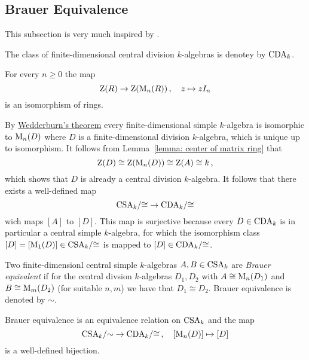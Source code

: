\subsection{Brauer Equivalence}


\begin{fluff}
  This subsection is very much inspired by \cite[4.2]{Clark2012NonCA}.
\end{fluff}


\begin{notation}
  The class of finite-dimensional central division $k$-algebras is denotey by $\operatorname{CDA}_k$.
\end{notation}


\begin{lemma}
  \label{lemma: center of matrix ring}
  For every $n \geq 0$ the map
  \[
            \operatorname{Z}(R)
    \to     \operatorname{Z}(\operatorname{M}_n(R))  \,,
    \quad   z
    \mapsto z I_n
  \]
  is an isomorphism of rings.
\end{lemma}


\begin{fluff}
  By \hyperref[theorem: wedderburns theorem]{Wedderburn’s theorem} every finite-dimensional simple $k$-algebra is isomorphic to $\operatorname{M}_n(D)$ where $D$ is a finite-dimensional division $k$-algebra, which is unique up to isomorphism.
  It follows from Lemma~\ref{lemma: center of matrix ring} that
  \[
          \operatorname{Z}(D)
    \cong \operatorname{Z}(\operatorname{M}_n(D))
    \cong \operatorname{Z}(A)
    \cong k \,,
  \]
  which shows that $D$ is already a central division $k$-algebra.
  It follows that there exists a well-defined map
  \[
        \operatorname{CSA}_k\!/{\cong}
    \to \operatorname{CDA}_k\!/{\cong}
  \]
  wich maps $[A]$ to $[D]$.
  This map is surjective because every $D \in \operatorname{CDA}_k$ is in particular a central simple $k$-algebra, for which the isomorphism class $[D] = [\operatorname{M}_1(D)] \in \operatorname{CSA}_k\!/{\cong}$ is mapped to $[D] \in \operatorname{CDA}_k\!/{\cong}$.
\end{fluff}


\begin{definition}
  Two finite-dimensionl central simple $k$-algebras $A, B \in \operatorname{CSA}_k$ are \emph{Brauer equivalent} if for the central divsion $k$-algebras $D_1, D_2$ with $A \cong \operatorname{M}_n(D_1)$ and $B \cong \operatorname{M}_m(D_2)$ (for suitable $n, m$) we have that $D_1 \cong D_2$.
  Brauer equivalence is denoted by $\sim$.
\end{definition}


\begin{corollary}
  Brauer equivalence is an equivalence relation on $\operatorname{CSA}_k$ and the map
  \[
        \operatorname{CSA}_k\!/{\sim}
    \to \operatorname{CDA}_k\!/{\cong} \,,
    \quad   [\operatorname{M}_n(D)]
    \mapsto [D]
  \]
  is a well-defined bijection.
\end{corollary}



